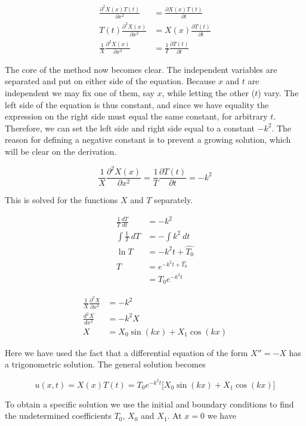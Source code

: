 \documentclass[12pt]{extarticle}
\begin{document}
\begin{align*}
	\frac{\partial^2 X(x)T(t)}{\partial x^2} &= \frac{\partial X(x)T(t)}{\partial t} \\
	T(t)\frac{\partial^2 X(x)}{\partial x^2} &= X(x)\frac{\partial T(t)}{\partial t} \\
	\frac{1}{X}\frac{\partial^2 X(x)}{\partial x^2} &= \frac{1}{T}\frac{\partial T(t)}{\partial t}
\end{align*}

The core of the method now becomes clear. The independent variables are separated and put on either side of the equation. Because $x$ and $t$ are independent we may fix one of them, say $x$, while letting the other ($t$) vary. The left side of the equation is thus constant, and since we have equality the expression on the right side must equal the same constant, for arbitrary $t$. Therefore, we can set the left side and right side equal to a constant $-k^2$. The reason for defining a negative constant is to prevent a growing solution, which will be clear on the derivation.

\[ \frac{1}{X}\frac{\partial^2 X(x)}{\partial x^2} = \frac{1}{T}\frac{\partial T(t)}{\partial t} = -k^2\]

This is solved for the functions $X$ and $T$ separately. 

\begin{align*}
	\frac{1}{T} \frac{dT}{dt} &= -k^2 \\
	\int \frac{1}{T}\:dT &= -\int k^2\:dt \\
	\ln T &= -k^2 t + \hat{T_0} \\
	T &= e^{-k^2t + \hat{T_0}} \\
	&= T_0 e^{-k^2t}
\end{align*}

\begin{align}
	\frac{1}{X} \frac{\partial^2 X}{\partial x^2} &= -k^2 \\
	\frac{d^2 X}{dx^2} &= -k^2 X \\
	X &= X_0 \sin(kx) + X_1 \cos(kx)
\end{align}

Here we have used the fact that a differential equation of the form $X'' = -X$ has a trigonometric solution. The general solution becomes

\[ u(x,t) = X(x)T(t) = T_0 e^{-k^2 t} \big[X_0\sin(kx) + X_1 \cos(kx)\big] \]

To obtain a specific solution we use the initial and boundary conditions to find the undetermined coefficients $T_0$, $X_0$ and $X_1$. At $x=0$ we have
\end{document}
